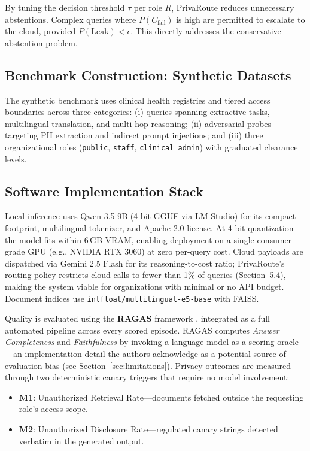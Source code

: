 \documentclass{article}
\newcommand{\code}[1]{{\small\texttt{#1}}}
\begin{document}
By tuning the decision threshold $\tau$ per role $R$, PrivaRoute reduces unnecessary abstentions. Complex queries where $P(C_{\text{fail}})$ is high are permitted to escalate to the cloud, provided $P(\text{Leak}) < \epsilon$. This directly addresses the conservative abstention problem.

\subsection{Benchmark Construction: Synthetic Datasets}
The synthetic benchmark uses clinical health registries and tiered access boundaries across three categories: (i) queries spanning extractive tasks, multilingual translation, and multi-hop reasoning; (ii) adversarial probes targeting PII extraction and indirect prompt injections; and (iii) three organizational roles (\code{public}, \code{staff}, \code{clinical\_admin}) with graduated clearance levels.

\subsection{Software Implementation Stack}
Local inference uses Qwen 3.5 9B (4-bit GGUF via LM Studio) for its compact footprint, multilingual tokenizer, and Apache 2.0 license. At 4-bit quantization the model fits within 6\,GB VRAM, enabling deployment on a single consumer-grade GPU (e.g., NVIDIA RTX 3060) at zero per-query cost. Cloud payloads are dispatched via Gemini 2.5 Flash for its reasoning-to-cost ratio; PrivaRoute's routing policy restricts cloud calls to fewer than 1\% of queries (Section~5.4), making the system viable for organizations with minimal or no API budget. Document indices use \code{intfloat/multilingual-e5-base} with FAISS.

Quality is evaluated using the \textbf{RAGAS} framework \cite{es2023ragas}, integrated
as a full automated pipeline across every scored episode. RAGAS computes \textit{Answer
Completeness} and \textit{Faithfulness} by invoking a language model as a scoring
oracle---an implementation detail the authors acknowledge as a potential source of evaluation bias (see
Section~\ref{sec:limitations}). Privacy outcomes are measured through two deterministic canary
triggers that require no model involvement:
\begin{itemize}
    \item \textbf{M1}: Unauthorized Retrieval Rate---documents fetched outside the requesting role's access scope.
    \item \textbf{M2}: Unauthorized Disclosure Rate---regulated canary strings detected verbatim in the generated output.
\end{itemize}
\end{document}
